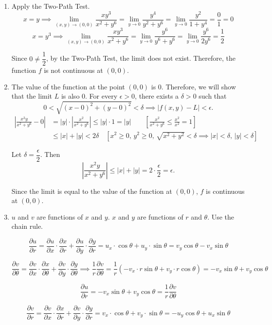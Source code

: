 \documentclass[a4paper, 12pt]{article}
\begin{document}
\begin{enumerate}[leftmargin=*,label=\textbf{\arabic*.}]
\newpage

\item Apply the Two-Path Test.
\[x=y\implies\lim_{(x,y)\to(0,0)}\frac{xy^3}{x^2+y^6}=\lim_{y\to0}\frac{y^4}{y^2+y^6}=\lim_{y\to0}\frac{y^2}{1+y^4}=\frac01=0\]
\[x=y^3\implies\lim_{(x,y)\to(0,0)}\frac{xy^3}{x^2+y^6}=\lim_{y\to0}\frac{y^6}{y^6+y^6}=\lim_{y\to0}\frac{y^6}{2y^6}=\frac12\]

Since $0\neq\dfrac12$, by the Two-Path Test, the limit does not exist. Therefore, the function $f$ is not continuous at $(0,0)$.

\item The value of the function at the point $(0,0)$ is $0$. Therefore, we will show that the limit $L$ is also $0$. For every $\epsilon>0$, there exists a $\delta>0$ such that
\[0<\sqrt{(x-0)^2+(y-0)^2}<\delta\implies\left|f(x,y)-L\right|<\epsilon.\]
\begin{align*}\left|\frac{x^2y}{x^2+y^6}-0\right|&=|y|\cdot\left|\frac{x^2}{x^2+y^6}\right|\leq|y|\cdot1=|y|\qquad\left[\frac{x^2}{x^2+y^6}\leq\frac{x^2}{x^2}=1\right]\\[1em]&\leq|x|+|y|<2\delta\quad\left[x^2\geq0,\,y^2\geq0,\,\sqrt{x^2+y^2}<\delta\implies|x|<\delta,\,|y|<\delta\right]\end{align*}

Let $\delta=\dfrac\epsilon2$. Then
\[\left|\frac{x^2y}{x^2+y^6}\right|\leq|x|+|y|=2\cdot\frac\epsilon2=\epsilon.\]

Since the limit is equal to the value of the function at $(0,0)$, $f$ is continuous at $(0,0)$.

\item $u$ and $v$ are functions of $x$ and $y$. $x$ and $y$ are functions of $r$ and $\theta$. Use the chain rule.

\[\frac{\partial u}{\partial r}=\frac{\partial u}{\partial x}\cdot\frac{\partial x}{\partial r}+\frac{\partial u}{\partial y}\cdot\frac{\partial y}{\partial r}=u_x\cdot\cos\theta+u_y\cdot\sin\theta=v_y\cos\theta-v_x\sin\theta\]

\[\frac{\partial v}{\partial\theta}=\frac{\partial v}{\partial x}\cdot\frac{\partial x}{\partial\theta}+\frac{\partial v}{\partial y}\cdot\frac{\partial y}{\partial\theta}\implies\frac1r\frac{\partial v}{\partial\theta}=\frac1r\left(-v_x\cdot r\sin\theta+v_y\cdot r\cos\theta\right)=-v_x\sin\theta+v_y\cos\theta\]

\[\frac{\partial u}{\partial r}=-v_x\sin\theta+v_y\cos\theta=\frac1r\frac{\partial v}{\partial\theta}\]

\[\frac{\partial v}{\partial r}=\frac{\partial v}{\partial x}\cdot\frac{\partial x}{\partial r}+\frac{\partial v}{\partial y}\cdot\frac{\partial y}{\partial r}=v_x\cdot\cos\theta+v_y\cdot\sin\theta=-u_y\cos\theta+u_x\sin\theta\]


\end{enumerate}
\end{document}
